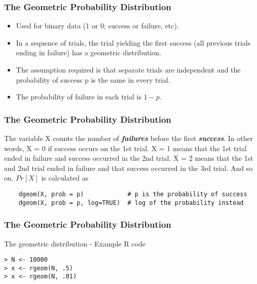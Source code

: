 \documentclass[MAIN.tex]{subfiles}
\begin{document}
 
\begin{frame}[fragile]
	\frametitle{The Geometric Probability Distribution}
	\begin{itemize}
\item	Used for binary data (1 or 0; success or failure, etc). 
\item In a sequence of trials, the trial yielding the first success (all previous trials ending in failure) has a geometric distribution. 
\item The assumption required is that separate trials are independent and the probability of success p is the same in every trial. 
\item The probability of failure in each trial is $1 - p$.
	\end{itemize}

\end{frame}
\begin{frame}[fragile]
	\frametitle{The Geometric Probability Distribution}
	The variable X counts the number of \textbf{\textit{failures}} before the first \textbf{\textit{success}}. In other words, X = 0 if success occurs on the 1st trial. X = 1 means that the 1st trial ended in failure and success occurred in the 2nd trial. X = 2 means that the 1st and 2nd trial ended in failure and that success occurred in the 3rd trial. And so on. $Pr[X]$ is calculated as
\begin{framed}
	\begin{verbatim}
	dgeom(X, prob = p)            # p is the probability of success
	dgeom(X, prob = p, log=TRUE)  # log of the probability instead
	\end{verbatim}
\end{framed}
\end{frame}
\begin{frame}[fragile]
\frametitle{The Geometric Probability Distribution}

The geometric distribution - Example R code
\begin{framed}
	\begin{verbatim}
> N <- 10000
> x <- rgeom(N, .5)
> x <- rgeom(N, .01)
	\end{verbatim}
\end{framed}
\end{frame}
\end{document}
